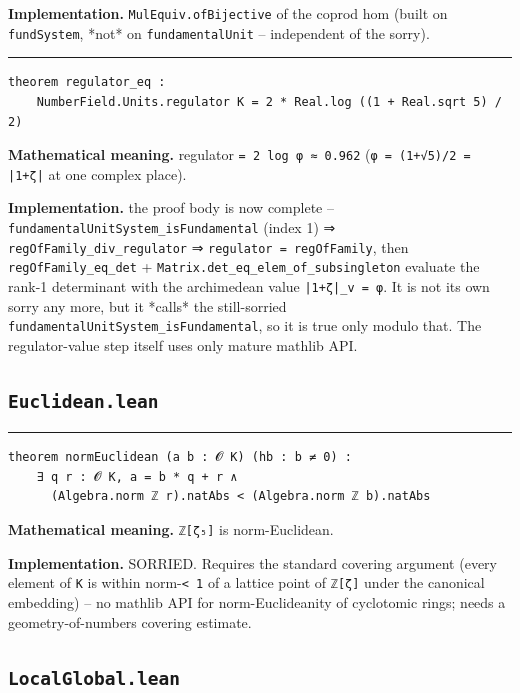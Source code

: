 \documentclass[UTF8,a4paper,11pt,fontset=fandol]{ctexart}
\theoremstyle{definition}
\newcommand{\statementsep}{\par\medskip\hrule\medskip}
\begin{document}
\noindent\textbf{Implementation.} \texttt{MulEquiv.\allowbreak{}ofBijective} of the coprod hom (built on \texttt{fundSystem}, *not* on \texttt{fundamentalUnit} -- independent of the sorry).\par
\statementsep
\begin{verbatim}
theorem regulator_eq :
    NumberField.Units.regulator K = 2 * Real.log ((1 + Real.sqrt 5) / 2)
\end{verbatim}
\noindent\textbf{Mathematical meaning.} regulator \texttt{= 2 log φ ≈ 0.\allowbreak{}962} (\texttt{φ = (1+√5)/\allowbreak{}2 = |1+ζ|} at one complex place).\par
\noindent\textbf{Implementation.} the proof body is now complete -- \texttt{fundamentalUnitSystem\_\allowbreak{}isFundamental} (index 1) ⇒ \texttt{regOfFamily\_\allowbreak{}div\_\allowbreak{}regulator} ⇒ \texttt{regulator = regOfFamily}, then \texttt{regOfFamily\_\allowbreak{}eq\_\allowbreak{}det} + \texttt{Matrix.\allowbreak{}det\_\allowbreak{}eq\_\allowbreak{}elem\_\allowbreak{}of\_\allowbreak{}subsingleton} evaluate the rank-1 determinant with the archimedean value \texttt{|1+ζ|\_\allowbreak{}v = φ}. It is not its own sorry any more, but it *calls* the still-sorried \texttt{fundamentalUnitSystem\_\allowbreak{}isFundamental}, so it is true only modulo that. The regulator-value step itself uses only mature mathlib API.\par

\subsection{\texttt{Euclidean.lean}}

\statementsep
\begin{verbatim}
theorem normEuclidean (a b : 𝓞 K) (hb : b ≠ 0) :
    ∃ q r : 𝓞 K, a = b * q + r ∧
      (Algebra.norm ℤ r).natAbs < (Algebra.norm ℤ b).natAbs
\end{verbatim}
\noindent\textbf{Mathematical meaning.} \texttt{ℤ[ζ₅]} is norm-Euclidean.\par
\noindent\textbf{Implementation.} SORRIED. Requires the standard covering argument (every element of \texttt{K} is within norm-\texttt{< 1} of a lattice point of \texttt{ℤ[ζ]} under the canonical embedding) -- no mathlib API for norm-Euclideanity of cyclotomic rings; needs a geometry-of-numbers covering estimate.\par

\subsection{\texttt{LocalGlobal.lean}}
\end{document}
